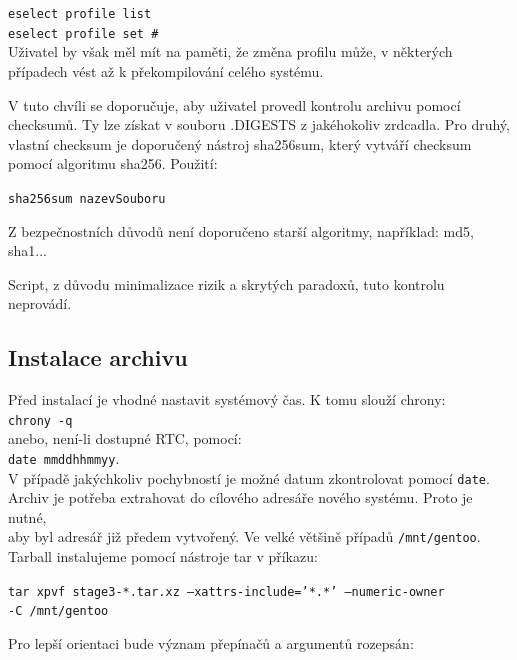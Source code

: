 \documentclass[12pt,a4paper,twoside,]{article}
\begin{document}
{\texttt{eselect profile list}\\
\texttt{\hspace*{--1.5em}eselect profile set \#}\\

{\hspace*{-1.5em}Uživatel by však měl mít na paměti, že změna profilu může, v některých případech
vést až k překompilování celého systému.}

\hspace*{-1.5em}V tuto chvíli se doporučuje, aby uživatel provedl kontrolu archivu pomocí checksumů.
Ty lze získat v souboru .DIGESTS z jakéhokoliv zrdcadla. Pro druhý, vlastní checksum je doporučený nástroj sha256sum, který vytváří checksum pomocí algoritmu sha256. Použití:

\texttt{sha256sum nazevSouboru}

\hspace*{-1.5em}Z bezpečnostních důvodů není doporučeno starší algoritmy, například: md5, sha1...

\hspace*{-1.5em}Script, z důvodu minimalizace rizik a skrytých paradoxů, tuto kontrolu neprovádí.
\newpage
\subsection{Instalace archivu}
Před instalací je vhodné nastavit systémový čas. K tomu slouží chrony:\\
\texttt{chrony -q}\\
 anebo, není-li dostupné RTC, pomocí: \\ \texttt{date mmddhhmmyy}.\\
V případě jakýchkoliv pochybností je možné datum zkontrolovat pomocí \texttt{date}.
\\Archiv je potřeba extrahovat do cílového adresáře nového systému. Proto je nutné,\\
aby byl adresář již předem vytvořený. Ve velké většině případů \texttt{/mnt/gentoo}.\\
Tarball instalujeme pomocí nástroje tar v příkazu:

\texttt{\hspace*{-1.5em}tar xpvf stage3-*.tar.xz --xattrs-include='*.*' --numeric-owner \\-C /mnt/gentoo}

\hspace*{-1.5em}Pro lepší orientaci bude význam přepínačů a argumentů rozepsán:

}
\end{document}
